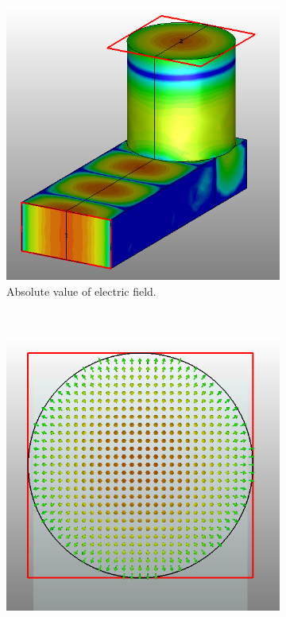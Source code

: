 \documentclass[english,twoside]{article}
\begin{document}
	
		\newpage
		\begin{landscape}
			\begin{figure}
				\centering
				\begin{subfigure}[b]{0.5\textwidth}
					\includegraphics[width=\textwidth]{figures/wrToWcTM01_irises_abs}
					\caption{Absolute value of electric field.}
				\end{subfigure}
				~
				\begin{subfigure}[b]{0.5\textwidth}
					\includegraphics[width=\textwidth]{figures/wrToWcTM01_irises_front}

\end{subfigure}
\end{figure}
\end{landscape}
\end{document}
